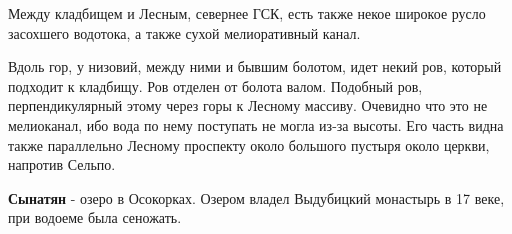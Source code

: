 Между кладбищем и Лесным, севернее ГСК, есть также некое широкое русло засохшего водотока, а также сухой мелиоративный канал. 

Вдоль гор, у низовий, между ними и бывшим болотом, идет некий ров, который подходит к кладбищу. Ров отделен от болота валом. 
Подобный ров, перпендикулярный этому через горы к Лесному массиву. Очевидно что это не мелиоканал, ибо вода по нему поступать не могла из-за высоты. Его часть видна также параллельно Лесному проспекту около большого пустыря около церкви, напротив Сельпо.
 
\textbf{Сынатян} - озеро в Осокорках. Озером владел Выдубицкий монастырь в 17 веке, при водоеме была сеножать.\\

